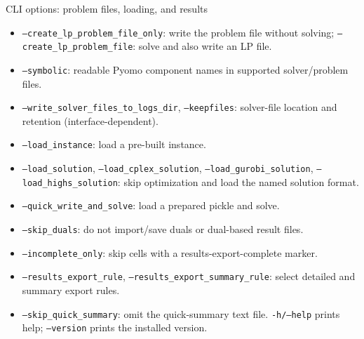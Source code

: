 \documentclass[aspectratio=169,10pt]{beamer}
\begin{document}
\begin{frame}{CLI options: problem files, loading, and results}
\scriptsize
\begin{itemize}
\item \texttt{--create\_lp\_problem\_file\_only}: write the problem file without solving; \texttt{--create\_lp\_problem\_file}: solve and also write an LP file.
\item \texttt{--symbolic}: readable Pyomo component names in supported solver/problem files.
\item \texttt{--write\_solver\_files\_to\_logs\_dir}, \texttt{--keepfiles}: solver-file location and retention (interface-dependent).
\item \texttt{--load\_instance}: load a pre-built instance.
\item \texttt{--load\_solution}, \texttt{--load\_cplex\_solution}, \texttt{--load\_gurobi\_solution}, \texttt{--load\_highs\_solution}: skip optimization and load the named solution format.
\item \texttt{--quick\_write\_and\_solve}: load a prepared pickle and solve.
\item \texttt{--skip\_duals}: do not import/save duals or dual-based result files.
\item \texttt{--incomplete\_only}: skip cells with a results-export-complete marker.
\item \texttt{--results\_export\_rule}, \texttt{--results\_export\_summary\_rule}: select detailed and summary export rules.
\item \texttt{--skip\_quick\_summary}: omit the quick-summary text file. \texttt{-h/--help} prints help; \texttt{--version} prints the installed version.
\end{itemize}
\end{frame}
\end{document}
